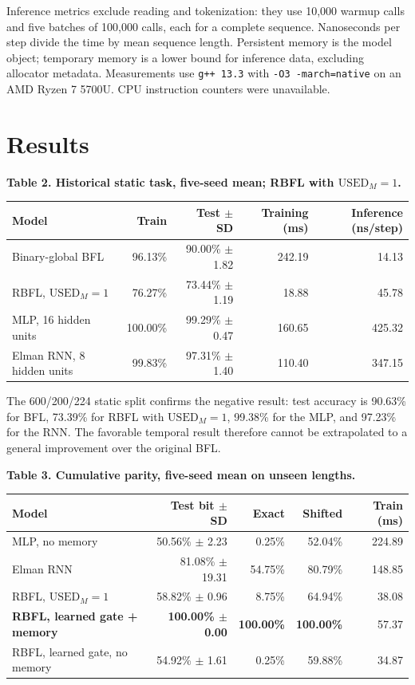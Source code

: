 \documentclass[10pt,a4paper]{article}
\newcommand{\UM}{\mathrm{USED}_{M}}
\newenvironment{fixedtable}[1]{\par\medskip\noindent\begin{minipage}{\linewidth}\centering\small\textbf{#1}\par\smallskip}{\end{minipage}\par\medskip}
\begin{document}
Inference metrics exclude reading and tokenization: they use 10,000 warmup calls and five batches of 100,000 calls, each for a complete sequence. Nanoseconds per step divide the time by mean sequence length. Persistent memory is the model object; temporary memory is a lower bound for inference data, excluding allocator metadata. Measurements use \texttt{g++ 13.3} with \texttt{-O3 -march=native} on an AMD Ryzen 7 5700U. CPU instruction counters were unavailable.

\section{Results}
\begin{fixedtable}{Table 2. Historical static task, five-seed mean; RBFL with $\UM=1$.}
\begin{tabular}{lrrrr}
\toprule
Model & Train & Test $\pm$ SD & Training (ms) & Inference (ns/step) \\
\midrule
Binary-global BFL & 96.13\% & 90.00\% $\pm$ 1.82 & 242.19 & 14.13 \\
RBFL, $\UM=1$ & 76.27\% & 73.44\% $\pm$ 1.19 & 18.88 & 45.78 \\
MLP, 16 hidden units & 100.00\% & 99.29\% $\pm$ 0.47 & 160.65 & 425.32 \\
Elman RNN, 8 hidden units & 99.83\% & 97.31\% $\pm$ 1.40 & 110.40 & 347.15 \\
\bottomrule
\end{tabular}
\end{fixedtable}

The 600/200/224 static split confirms the negative result: test accuracy is 90.63\% for BFL, 73.39\% for RBFL with $\UM=1$, 99.38\% for the MLP, and 97.23\% for the RNN. The favorable temporal result therefore cannot be extrapolated to a general improvement over the original BFL.

\begin{fixedtable}{Table 3. Cumulative parity, five-seed mean on unseen lengths.}
\setlength{\tabcolsep}{3pt}
\begin{tabular}{@{}lrrrr@{}}
\toprule
Model & Test bit $\pm$ SD & Exact & Shifted & Train (ms) \\
\midrule
MLP, no memory & 50.56\% $\pm$ 2.23 & 0.25\% & 52.04\% & 224.89 \\
Elman RNN & 81.08\% $\pm$ 19.31 & 54.75\% & 80.79\% & 148.85 \\
RBFL, $\UM=1$ & 58.82\% $\pm$ 0.96 & 8.75\% & 64.94\% & 38.08 \\
\textbf{RBFL, learned gate + memory} & \textbf{100.00\% $\pm$ 0.00} & \textbf{100.00\%} & \textbf{100.00\%} & 57.37 \\
RBFL, learned gate, no memory & 54.92\% $\pm$ 1.61 & 0.25\% & 59.88\% & 34.87 \\
\bottomrule
\end{tabular}
\end{fixedtable}
\end{document}
